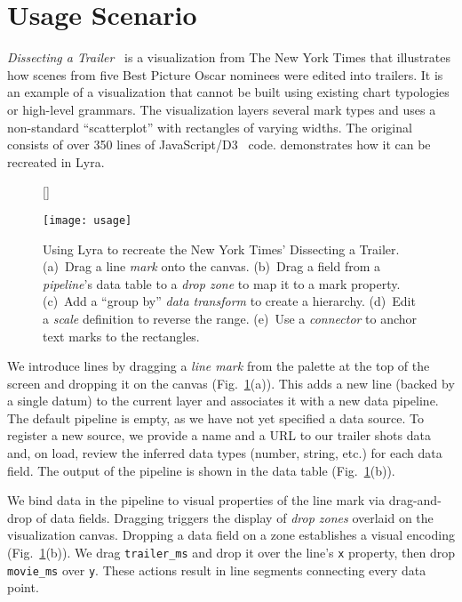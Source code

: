 \vspace{-10pt}

\section{Usage Scenario}

\vspace{-10pt}

\emph{Dissecting a Trailer}~\cite{nytimes:trailer} is a visualization from The
New York Times that illustrates how scenes from five Best Picture Oscar nominees
were edited into trailers. It is an example of a visualization that cannot be
built using existing chart typologies or high-level grammars. The visualization
layers several mark types and uses a non-standard ``scatterplot'' with
rectangles of varying widths. The original consists of over 350 lines of
JavaScript/D3~\cite{bostock:d3} code.  demonstrates how it
can be recreated in Lyra.

\begin{figure}[h!]
[\FBwidth]
{\caption{Using Lyra to recreate the New York Times' Dissecting a Trailer.
(a)~Drag a line \emph{mark} onto the canvas. (b)~Drag a field from a
\emph{pipeline}'s data table to a \emph{drop zone} to map it to a mark property.
(c)~Add a ``group by'' \emph{data transform} to create a hierarchy. (d)~Edit a
\emph{scale} definition to reverse the range. (e)~Use a \emph{connector} to
anchor text marks to the rectangles.}
\label{fig:lyra:usage}}
{\texttt{[image: usage]}}
\end{figure}

We introduce lines by dragging a \emph{line mark} from the palette at the top of
the screen and dropping it on the canvas (Fig.~\ref{fig:lyra:usage}(a)). This
adds a new line (backed by a single datum) to the current layer and associates
it with a new data pipeline. The default pipeline is empty, as we have not yet
specified a data source. To register a new source, we provide a name and a URL
to our trailer shots data and, on load, review the inferred data types (number,
string, etc.) for each data field. The output of the pipeline is shown in the
data table (Fig.~\ref{fig:lyra:usage}(b)).

We bind data in the pipeline to visual properties of the line mark via
drag-and-drop of data fields. Dragging triggers the display of \emph{drop zones}
overlaid on the visualization canvas. Dropping a data field on a zone
establishes a visual encoding (Fig.~\ref{fig:lyra:usage}(b)). We drag
\texttt{trailer\_ms} and drop it over the line's \texttt{x} property, then drop
\texttt{movie\_ms} over \texttt{y}. These actions result in line segments
connecting every data point.

